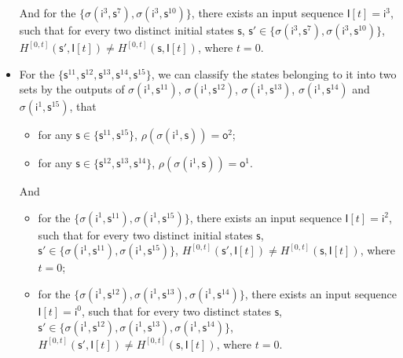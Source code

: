 \begin{itemize}
 
  And for the $\{\sigma (\mathsf{i}^3, \mathsf{s}^7),\sigma (\mathsf{i}^3, \mathsf{s}^{10})\}$, there exists an input sequence $\mathsf{I}[t]=\mathsf{i}^3$, such that for every two distinct initial states $\mathsf{s}$, $\mathsf{s}'\in \{\sigma (\mathsf{i}^3, \mathsf{s}^7),\sigma (\mathsf{i}^3, \mathsf{s}^{10})\}$, $H^{[0,t]}(\mathsf{s}',\mathsf{I}[t])\neq H^{[0,t]}(\mathsf{s}, \mathsf{I}[t])$, where $t=0$.
  
  \item For the $\{\mathsf{s}^{11},\mathsf{s}^{12},\mathsf{s}^{13},\mathsf{s}^{14},\mathsf{s}^{15}\}$, we can classify the states belonging to it into two sets  by the outputs of $\sigma (\mathsf{i}^1,\mathsf{s}^{11})$, $\sigma (\mathsf{i}^1, \mathsf{s}^{12})$, $\sigma (\mathsf{i}^1, \mathsf{s}^{13})$, $\sigma (\mathsf{i}^1, \mathsf{s}^{14})$ and $\sigma (\mathsf{i}^1, \mathsf{s}^{15})$, that  
    \begin{itemize}
     \item  for any $\mathsf{s}\in\{\mathsf{s}^{11}, \mathsf{s}^{15}\}$, $\rho(\sigma (\mathsf{i}^1,\mathsf{s}))=\mathsf{o}^2$;
   \item  for any $\mathsf{s}\in\{\mathsf{s}^{12},\mathsf{s}^{13},\mathsf{s}^{14}\}$, $\rho(\sigma (\mathsf{i}^1,\mathsf{s}))=\mathsf{o}^1$.
  \end{itemize}
  And 
  \begin{itemize}
   \item for the $ \{\sigma (\mathsf{i}^1, \mathsf{s}^{11}),\sigma (\mathsf{i}^1, \mathsf{s}^{15})\}$, there exists an input sequence $\mathsf{I}[t]=\mathsf{i}^2$, such that for every two distinct initial states $\mathsf{s}$, $\mathsf{s}'\in \{\sigma (\mathsf{i}^1, \mathsf{s}^{11}),\sigma (\mathsf{i}^1, \mathsf{s}^{15})\}$,  $H^{[0,t]}(\mathsf{s}',\mathsf{I}[t])\neq H^{[0,t]}(\mathsf{s}, \mathsf{I}[t])$, where $t=0$;
  \item  for the $\{\sigma (\mathsf{i}^1,\mathsf{s}^{12}),\sigma (\mathsf{i}^1, \mathsf{s}^{13}), \sigma (\mathsf{i}^1, \mathsf{s}^{14})\}$,  there exists an input sequence $\mathsf{I}[t]=\mathsf{i}^0$, such that for every two distinct states $\mathsf{s}$, $\mathsf{s}'\in \{\sigma (\mathsf{i}^1,\mathsf{s}^{12}),\sigma (\mathsf{i}^1, \mathsf{s}^{13}), \sigma (\mathsf{i}^1, \mathsf{s}^{14})\}$, $H^{[0,t]}(\mathsf{s}',\mathsf{I}[t])\neq H^{[0,t]}(\mathsf{s}, \mathsf{I}[t])$, where $t=0$.
  \end{itemize}
\end{itemize} 
